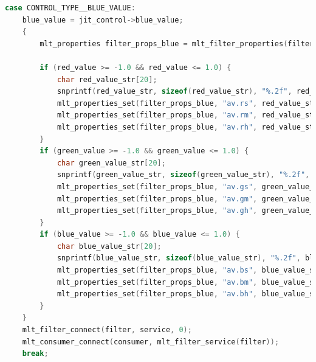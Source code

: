 \documentclass[../MasterThesis.tex]{subfiles}
\begin{document}
\begin{lstlisting}[language=c, numbers=none, columns=fullflexible]	
case CONTROL_TYPE__BLUE_VALUE:
	blue_value = jit_control->blue_value;
	{
		mlt_properties filter_props_blue = mlt_filter_properties(filter);
		
		if (red_value >= -1.0 && red_value <= 1.0) {
			char red_value_str[20]; 
			snprintf(red_value_str, sizeof(red_value_str), "%.2f", red_value);
			mlt_properties_set(filter_props_blue, "av.rs", red_value_str);
			mlt_properties_set(filter_props_blue, "av.rm", red_value_str);
			mlt_properties_set(filter_props_blue, "av.rh", red_value_str);
		}	
		if (green_value >= -1.0 && green_value <= 1.0) {
			char green_value_str[20]; 
			snprintf(green_value_str, sizeof(green_value_str), "%.2f", green_value);
			mlt_properties_set(filter_props_blue, "av.gs", green_value_str);
			mlt_properties_set(filter_props_blue, "av.gm", green_value_str);
			mlt_properties_set(filter_props_blue, "av.gh", green_value_str);
		}	
		if (blue_value >= -1.0 && blue_value <= 1.0) {
			char blue_value_str[20]; 
			snprintf(blue_value_str, sizeof(blue_value_str), "%.2f", blue_value);
			mlt_properties_set(filter_props_blue, "av.bs", blue_value_str);
			mlt_properties_set(filter_props_blue, "av.bm", blue_value_str);
			mlt_properties_set(filter_props_blue, "av.bh", blue_value_str);
		}	
	}
	mlt_filter_connect(filter, service, 0);
	mlt_consumer_connect(consumer, mlt_filter_service(filter));
	break; 

\end{lstlisting}



	
	
	
\end{document}
